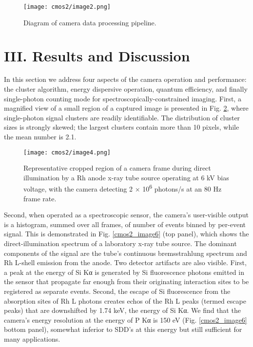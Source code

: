 \begin{figure}[h] \label{cmos2_image2}
\caption{ Diagram of camera data processing pipeline.
}
\centering
\texttt{[image: cmos2/image2.png]}
\end{figure}

\section{III. Results and Discussion}

In this section we address four aspects of the camera operation and
performance: the cluster algorithm, energy dispersive operation, quantum
efficiency, and finally single-photon counting mode for
spectroscopically-constrained imaging. First, a magnified view of a
small region of a captured image is presented in Fig. \ref{cmos2_image4}, where
single-photon signal clusters are readily identifiable. The distribution
of cluster sizes is strongly skewed; the largest clusters contain more
than 10 pixels, while the mean number is 2.1.

\begin{figure}[h] \label{cmos2_image4}
\caption{
 Representative cropped region of a camera frame during direct
illumination by a Rh anode x-ray tube source operating at 6 kV bias
voltage, with the camera detecting 2 $\times$ 10\textsuperscript{6} photons/s
at an 80 Hz frame rate.
}
\centering
\texttt{[image: cmos2/image4.png]}
\end{figure}

Second, when operated as a spectroscopic sensor, the camera's
user-visible output is a histogram, summed over all frames, of number of
events binned by per-event signal. This is demonstrated in Fig. \ref{cmos2_image6} (top
panel), which shows the direct-illumination spectrum of a laboratory
x-ray tube source. The dominant components of the signal are the tube's
continuous bremsstrahlung spectrum and Rh L-shell emission from the
anode. Two detector artifacts are also visible. First, a peak at the
energy of Si Kα is generated by Si fluorescence photons emitted in the
sensor that propagate far enough from their originating interaction
sites to be registered as separate events. Second, the escape of Si
fluorescence from the absorption sites of Rh L photons creates echos of
the Rh L peaks (termed escape peaks) that are downshifted by 1.74 keV,
the energy of Si Kα. We find that the camera's energy resolution at the
energy of P Kα is 150 eV (Fig. \ref{cmos2_image6} bottom panel), somewhat inferior to
SDD's at this energy but still sufficient for many applications.

